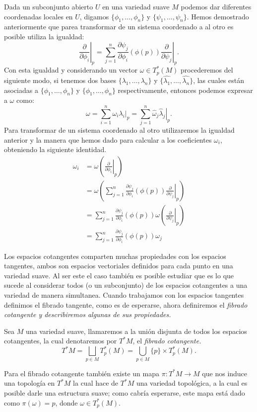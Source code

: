 Dada un subconjunto abierto $U$ en una variedad suave $M$ podemos dar diferentes coordenadas locales en $U$, digamos $\{\phi_1,\ldots,\phi_n\}$ y $\{\psi_1,\ldots,\psi_n\}$. Hemos demostrado anteriormente que parea transformar de un sistema coordenado a al otro es posible utiliza la igualdad:
\[
	\left. \frac{\partial}{\partial \phi_i} \right|_p =
	\sum_{j=1}^{n} \left. \frac{\partial \psi_j}{\partial \phi_i} (\phi(p))
	\frac{\partial}{\partial \psi_j} \right|_{p}.
\]
Con esta igualdad y considerando un vector $\omega \in T_{p}^{*}(M)$ procederemos del siguiente modo, si tenemos dos bases $\{\lambda_1,\ldots,\lambda_n\}$ y $\{\hat{\lambda_1},\ldots,\hat{\lambda_n}\}$, las cuales están asociadas a $\{\phi_1, \ldots, \phi_n\}$ y $\{\phi_1, \ldots, \phi_n\}$ respectivamente, entonces podemos expresar a $\omega$ como:
\[
	\omega = \sum_{i=1}^{n} \left. \omega_i \lambda_i \right|_p
	= \sum_{j=1}^{n} \left. \hat{\omega}_j \hat{\lambda}_j \right|_p.
\]
Para transformar de un sistema coordenado al otro utilizaremos la igualdad anterior y la manera que hemos dado para calcular a los coeficientes $\omega_i$, obteniendo la siguiente identidad.
\begin{align*}
	\omega_i & = \omega
	\left(
	\left. \frac{\partial}{\partial \phi_i} \right|_{p}
	\right)                                                                       \\
	         & = \omega
	\left(
	\sum_{j=1}^{n} \frac{\partial \psi_j}{\partial \phi_i} (\phi(p))
	\left. \frac{\partial}{\partial \psi_j}\right|_{p} \right)                    \\
	         & = \sum_{j=1}^{n} \frac{\partial \psi_j}{\partial \phi_i} (\phi(p))
	\omega \left( \left. \frac{\partial}{\partial \psi_j}\right|_{p} \right)      \\
	         & = \sum_{j=1}^{n} \frac{\partial \psi_j}{\partial \phi_i} (\phi(p))
	\omega_j
\end{align*}

Los espacios cotangentes comparten muchas propiedades con los espacios tangentes, ambos son espacios vectoriales definidos para cada punto en una variedad suave. Al ser este el caso también es posible estudiar que es lo que sucede al considerar todos (o un subconjunto) de los espacios cotangentes a una variedad de manera simultanea. Cuando trabajamos con los espacios tangentes definimos el fibrado tangente, como es de esperarse, ahora definiremos el \it{fibrado cotangente} y describiremos algunas de sus propiedades.

\begin{definition}
  Sea $M$ una variedad suave, llamaremos a la unión disjunta de todos los espacios cotangentes, la cual denotaremos por $T^{*}M$, el \it{fibrado cotangente}.
  \[ T^{*}M = \bigsqcup_{p \in M} T_{p}^{*}(M) = \bigcup_{p \in M} \{p\} \times T_{p}^{*}(M). \]
\end{definition}

Para el fibrado cotangente también existe un mapa $\pi: T^{*}M \to M$ que nos induce una topología en $T^{*}M$ la cual hace de $T^{*}M$ una variedad topológica, a la cual es posible darle una estructura suave; como cabría esperarse, este mapa está dado como $\pi(\omega) = p$, donde $\omega \in T_p^{*}(M)$.
